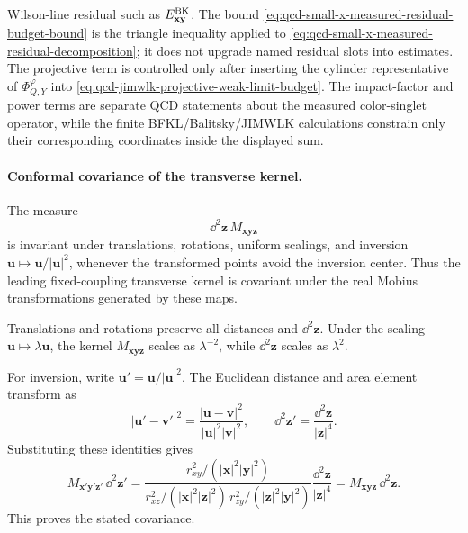 \begin{remark}
Wilson-line residual such as \(E^{\rm BK}_{\mathbf x\mathbf y}\).
The bound \eqref{eq:qcd-small-x-measured-residual-budget-bound} is the
triangle inequality applied to
\eqref{eq:qcd-small-x-measured-residual-decomposition}; it does not upgrade
named residual slots into estimates.  The projective term is controlled only
after inserting the cylinder representative of \(\Phi^\varphi_{Q,Y}\) into
\eqref{eq:qcd-jimwlk-projective-weak-limit-budget}.  The impact-factor and
power terms are separate QCD statements about the measured color-singlet
operator, while the finite BFKL/Balitsky/JIMWLK calculations constrain only
their corresponding coordinates inside the displayed sum.
\end{remark}

\paragraph{Conformal covariance of the transverse kernel.}
The measure
\[
  \dd^2\mathbf z\,M_{\mathbf x\mathbf y\mathbf z}
\]
is invariant under translations, rotations, uniform scalings, and inversion
\(\mathbf u\mapsto\mathbf u/|\mathbf u|^2\), whenever the transformed points
avoid the inversion center.  Thus the leading fixed-coupling transverse
kernel is covariant under the real Mobius transformations generated by these
maps.

Translations and rotations preserve all distances and \(\dd^2\mathbf z\).
Under the scaling \(\mathbf u\mapsto\lambda\mathbf u\), the kernel
\(M_{\mathbf x\mathbf y\mathbf z}\) scales as \(\lambda^{-2}\), while
\(\dd^2\mathbf z\) scales as \(\lambda^2\).

For inversion, write \(\mathbf u'=\mathbf u/|\mathbf u|^2\).  The Euclidean
distance and area element transform as
\[
  |\mathbf u'-\mathbf v'|^2
  =
  \frac{|\mathbf u-\mathbf v|^2}
       {|\mathbf u|^2|\mathbf v|^2},
  \qquad
  \dd^2\mathbf z'
  =
  \frac{\dd^2\mathbf z}{|\mathbf z|^4}.
\]
Substituting these identities gives
\[
  M_{\mathbf x'\mathbf y'\mathbf z'}\,\dd^2\mathbf z'
  =
  \frac{
    r_{xy}^2/(|\mathbf x|^2|\mathbf y|^2)
  }{
    r_{xz}^2/(|\mathbf x|^2|\mathbf z|^2)\,
    r_{zy}^2/(|\mathbf z|^2|\mathbf y|^2)
  }
  \frac{\dd^2\mathbf z}{|\mathbf z|^4}
  =
  M_{\mathbf x\mathbf y\mathbf z}\,\dd^2\mathbf z.
\]
This proves the stated covariance.

